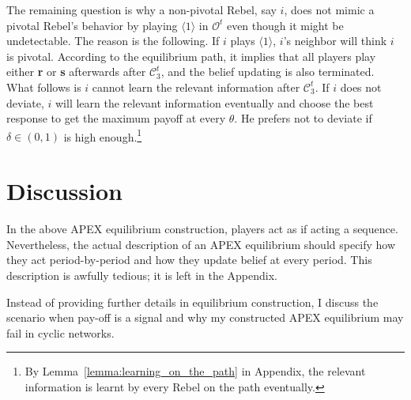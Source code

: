 \documentclass[12pt,letter]{article}
\newcommand{\Kappa}{\mathcal{C}}
\newcommand{\Omicron}{\mathcal{O}}
\theoremstyle{definition}
\theoremstyle{remark}
\theoremstyle{claim}
\begin{document}
The remaining question is why a non-pivotal Rebel, say $i$, does not mimic a pivotal Rebel's behavior by playing $\langle 1 \rangle$ in $\Omicron^t$ even though it might be undetectable. The reason is the following. If $i$ plays $\langle 1 \rangle$, $i$'s neighbor will think $i$ is pivotal. According to the equilibrium path, it implies that all players play either \textbf{r} or \textbf{s} afterwards after $\Kappa^t_{3}$, and the belief updating is also terminated. What follows is $i$ cannot learn the relevant information after $\Kappa^t_{3}$. If $i$ does not deviate, $i$ will learn the relevant information eventually and choose the best response to get the maximum payoff at every $\theta$. He prefers not to deviate if $\delta\in(0,1)$ is high enough.\footnote{By Lemma~\ref{lemma:learning_on_the_path} in Appendix, the relevant information is learnt by every Rebel on the path eventually.} 







\section{Discussion}
\label{sec:varies}
%
%
In the above APEX equilibrium construction, players act as if acting a sequence. Nevertheless, the actual description of an APEX equilibrium should specify how they act period-by-period and how they update belief at every period. This description is awfully tedious; it is left in the Appendix.

Instead of providing further details in equilibrium construction, I discuss the scenario when pay-off is a signal and why my constructed APEX equilibrium may fail in cyclic networks.
\end{document}
